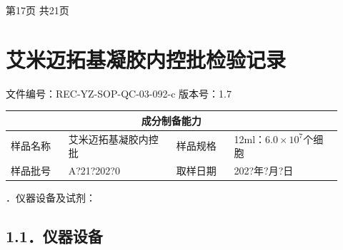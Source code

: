 \documentclass[UTF8,10pt,a4paper,fontset=fandol]{ctexart}
\newcommand{\fieldvalue}[1]{#1}
\newcommand{\handwritten}[1]{#1}
\begin{document}
\vfill
\begin{center}
第17页 共21页
\end{center}

\newpage

\section*{艾米迈拓基凝胶内控批检验记录}

\noindent
文件编号：REC-YZ-SOP-QC-03-092-c \quad 版本号：1.7

\begin{center}
\begin{tabular}{|p{0.16\linewidth}|p{0.30\linewidth}|p{0.16\linewidth}|p{0.30\linewidth}|}
\hline
\multicolumn{4}{|c|}{成分制备能力} \\ \hline
样品名称 &
\fieldvalue{艾米迈拓基凝胶内控批} &
样品规格 &
\fieldvalue{12ml：$6.0\times10^{7}$个细胞}
\\ \hline
样品批号 &
\fieldvalue{\handwritten{A?21?202?0}} &
取样日期 &
\fieldvalue{\handwritten{202?年?月?日}}
\\ \hline
\end{tabular}
\end{center}

．仪器设备及试剂：

\subsection*{1.1．仪器设备}
\end{document}
